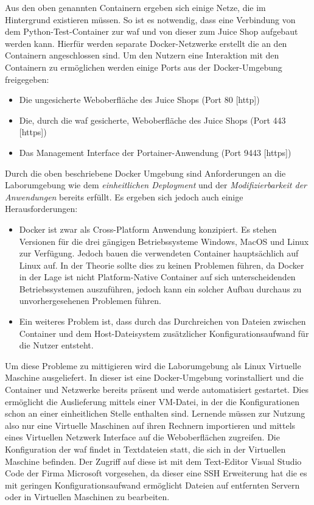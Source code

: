 Aus den oben genannten Containern ergeben sich einige Netze, die im Hintergrund existieren müssen.
So ist es notwendig, dass eine Verbindung von dem Python-Test-Container zur \ac{waf} und von dieser zum Juice Shop aufgebaut werden kann.
Hierfür werden separate Docker-Netzwerke erstellt die an den Containern angeschlossen sind.
Um den Nutzern eine Interaktion mit den Containern zu ermöglichen werden einige Ports aus der Docker-Umgebung freigegeben:

\begin{itemize}
    \item Die ungesicherte Weboberfläche des Juice Shops (Port 80 [\ac{http}])
    \item Die, durch die \ac{waf} gesicherte, Weboberfläche des Juice Shops (Port 443 [\ac{https}])
    \item Das Management Interface der Portainer-Anwendung (Port 9443 [\ac{https}])
\end{itemize}

Durch die oben beschriebene Docker Umgebung sind Anforderungen an die Laborumgebung wie dem \textit{einheitlichen Deployment} und der \textit{Modifizierbarkeit der Anwendungen} bereits erfüllt.
Es ergeben sich jedoch auch einige Herausforderungen:

\begin{itemize}
    \item Docker ist zwar als Cross-Platform Anwendung konzipiert.
    Es stehen Versionen für die drei gängigen Betriebssysteme Windows, MacOS und Linux zur Verfügung.
    Jedoch bauen die verwendeten Container hauptsächlich auf Linux auf.
    In der Theorie sollte dies zu keinen Problemen führen, da Docker in der Lage ist nicht Platform-Native Container auf sich unterscheidenden Betriebssystemen auszuführen, jedoch kann ein solcher Aufbau durchaus zu unvorhergesehenen Problemen führen.
    \item Ein weiteres Problem ist, dass durch das Durchreichen von Dateien zwischen Container und dem Host-Dateisystem zusätzlicher Konfigurationsaufwand für die Nutzer entsteht.
\end{itemize}

Um diese Probleme zu mittigieren wird die Laborumgebung als Linux Virtuelle Maschine ausgeliefert.
In dieser ist eine Docker-Umgebung vorinstalliert und die Container und Netzwerke bereits präsent und werde automatisiert gestartet.
Dies ermöglicht die Auslieferung mittels einer VM-Datei, in der die Konfigurationen schon an einer einheitlichen Stelle enthalten sind.
Lernende müssen zur Nutzung also nur eine Virtuelle Maschinen auf ihren Rechnern importieren und mittels eines Virtuellen Netzwerk Interface auf die Weboberflächen zugreifen.
Die Konfiguration der \ac{waf} findet in Textdateien statt, die sich in der Virtuellen Maschine befinden.
Der Zugriff auf diese ist mit dem Text-Editor Visual Studio Code der Firma Microsoft vorgesehen, da dieser eine SSH Erweiterung hat die es mit geringen Konfigurationsaufwand ermöglicht Dateien auf entfernten Servern oder in Virtuellen Maschinen zu bearbeiten.

